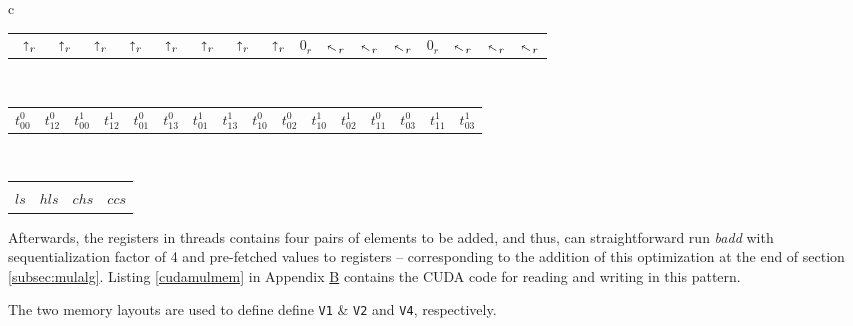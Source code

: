 \begin{center}
\begin{tabular}{c}
    \begin{tabular}{C{0.46cm}C{0.46cm}C{0.46cm}C{0.46cm}C{0.5cm}C{0.46cm}C{0.46cm}C{0.46cm}C{0.5cm}C{0.46cm}C{0.46cm}C{0.46cm}C{0.5cm}C{0.46cm}C{0.46cm}C{0.46cm}}
      $\,~\shortuparrow_r$ & $\,~\shortuparrow_{r}$ & $\,~\shortuparrow_{r}$ & $\,~\shortuparrow_{r}$ & $\,~\shortuparrow_{r}$ & $\,~\shortuparrow_{r}$ & $\,~\shortuparrow_{r}$  & $\,~\shortuparrow_{r}$ & \scriptsize $0_{r}$ & $\diagonalarrowleftup_{r}$ & $\diagonalarrowleftup_{r}$  & $\diagonalarrowleftup_{r}$  & \scriptsize $0_{r}$ & $\diagonalarrowleftup_{r}$  & $\diagonalarrowleftup_{r}$ & $\diagonalarrowleftup_{r}$
    \end{tabular}\\
    \begin{tabular}{C{0.46cm}C{0.46cm}C{0.46cm}C{0.46cm}C{0.46cm}C{0.46cm}C{0.46cm}C{0.46cm}C{0.46cm}C{0.46cm}C{0.46cm}C{0.46cm}C{0.46cm}C{0.46cm}C{0.46cm}C{0.46cm}}
      \color{Crimson}$t^0_{00}$ & \color{Crimson}$t^0_{12}$ & \color{RoyalBlue}$t^1_{00}$ & \color{RoyalBlue}$t^1_{12}$ & \color{Crimson}$t^0_{01}$ & \color{Crimson}$t^0_{13}$ & \color{RoyalBlue}$t^1_{01}$ & \color{RoyalBlue}$t^1_{13}$ & \color{Crimson}$t^0_{10}$ & \color{Crimson}$t^0_{02}$ & \color{RoyalBlue}$t^1_{10}$ & \color{RoyalBlue}$t^1_{02}$ & \color{Crimson}$t^0_{11}$ & \color{Crimson}$t^0_{03}$ & \color{RoyalBlue}$t^1_{11}$ & \color{RoyalBlue}$t^1_{03}$
    \end{tabular}\\[-0.5ex]
    \begin{tabular}{C{3.2cm}C{3.2cm}C{3.2cm}C{3.2cm}}
      \upbracefill & \upbracefill & \upbracefill & \upbracefill\\[-0.3ex]
      $\mathit{ls}$ & $\mathit{hls}$ & $\mathit{chs}$ & $\mathit{ccs}$
    \end{tabular}
  \end{tabular}
\end{center}
Afterwards, the registers in threads contains four pairs of elements to be
added, and thus, can straightforward run \textit{badd} with sequentialization
factor of 4 and pre-fetched values to registers -- corresponding to the addition
of this optimization at the end of section \ref{subsec:mulalg}. Listing
\ref{cudamulmem} in Appendix \hyperref[app:B]{B} contains the CUDA code for
reading and writing in this pattern.

The two memory layouts are used to define define \texttt{V1} \& \texttt{V2} and
\texttt{V4}, respectively.

